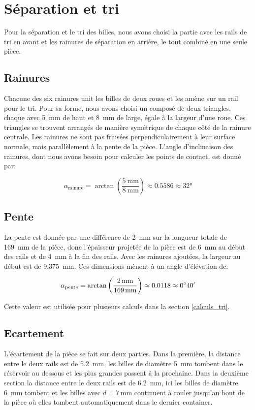 \section{Séparation et tri}
Pour la séparation et le tri des billes, nous avons choisi la partie avec les rails de tri en avant et les rainures de séparation en arrière, le tout combiné en une seule pièce.

\subsection{Rainures}
Chacune des six rainures unit les billes de deux roues et les amène sur un rail pour le tri. Pour sa forme, nous avons choisi un composé de deux triangles, chaque avec \SI{5}{\milli\metre} de haut et \SI{8}{\milli\metre} de large, égale à la largeur d'une roue. Ces triangles se trouvent arrangés de manière symétrique de chaque côté de la rainure centrale. Les rainures ne sont pas fraisées perpendiculairement à leur surface normale, mais parallèlement à la pente de la pièce. L'angle d'inclinaison des rainures, dont nous avons besoin pour calculer les points de contact, est donné par:

\[\alpha_{\text{rainure}} = \arctan\left(\frac{\SI{5}{\milli\metre}}{\SI{8}{\milli\metre}}\right) \approx \num{0.5586} \approx \ang{32}\]

\subsection{Pente}
La pente est donnée par une différence de \SI{2}{\milli\metre} sur la longueur totale de \SI{169}{\milli\metre} de la pièce, donc l'épaisseur projetée de la pièce est de \SI{6}{\mm} au début des rails et de \SI{4}{\mm} à la fin des rails. Avec les rainures ajoutées, la largeur au début est de \SI{9.375}{\mm}. Ces dimensions mènent à un angle d'élévation de:

\[\alpha_{\text{pente}} = \arctan\left(\frac{\SI{2}{\milli\metre}}{\SI{169}{\milli\metre}}\right) \approx \num{0.0118} \approx \sisetup{add-arc-degree-zero} \ang{;40;}\]

Cette valeur est utilisée pour plusieurs calculs dans la section \ref{calculs_tri}.

\subsection{Ecartement}
L'écartement de la pièce se fait sur deux parties. Dans la première, la distance entre le deux rails est de \SI{5.2}{\mm}, les billes de diamètre \SI{5}{\mm} tombent dans le réservoir au dessous et les plus grandes passent à la prochaine. Dans la deuxième section la distance entre le deux rails est de \SI{6.2}{\mm}, ici les billes de diamètre \SI{6}{\mm} tombent et les billes avec $d = \SI{7}{\mm}$ continuent à rouler jusqu'au bout de la pièce où elles tombent automatiquement dans le dernier container.

